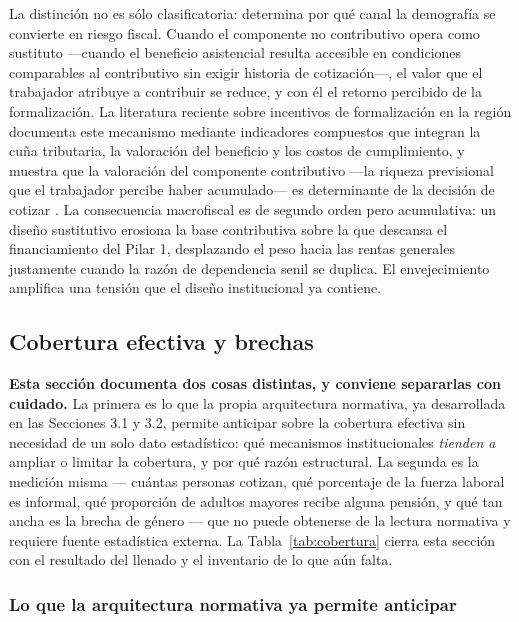 \documentclass[12pt, letterpaper]{article}
\begin{document}
La distinción no es sólo clasificatoria: determina por qué canal la demografía se
convierte en riesgo fiscal. Cuando el componente no contributivo opera como
sustituto ---cuando el beneficio asistencial resulta accesible en condiciones
comparables al contributivo sin exigir historia de cotización---, el valor que el
trabajador atribuye a contribuir se reduce, y con él el retorno percibido de la
formalización. La literatura reciente sobre incentivos de formalización en la
región documenta este mecanismo mediante indicadores compuestos que integran la
cuña tributaria, la valoración del beneficio y los costos de cumplimiento, y
muestra que la valoración del componente contributivo ---la riqueza previsional
que el trabajador percibe haber acumulado--- es determinante de la decisión de
cotizar \citep{wb2025}. La consecuencia macrofiscal es de segundo orden pero
acumulativa: un diseño sustitutivo erosiona la base contributiva sobre la que
descansa el financiamiento del Pilar 1, desplazando el peso hacia las rentas
generales justamente cuando la razón de dependencia senil se duplica. El
envejecimiento amplifica una tensión que el diseño institucional ya contiene.

\subsection{Cobertura efectiva y brechas}

\textbf{Esta sección documenta dos cosas distintas, y conviene separarlas con cuidado.} La primera es lo que la propia arquitectura normativa, ya desarrollada en las Secciones 3.1 y 3.2, permite anticipar sobre la cobertura efectiva sin necesidad de un solo dato estadístico: qué mecanismos institucionales \textit{tienden a} ampliar o limitar la cobertura, y por qué razón estructural. La segunda es la medición misma --- cuántas personas cotizan, qué porcentaje de la fuerza laboral es informal, qué proporción de adultos mayores recibe alguna pensión, y qué tan ancha es la brecha de género --- que no puede obtenerse de la lectura normativa y requiere fuente estadística externa. La Tabla~\ref{tab:cobertura} cierra esta sección con el resultado del llenado y el inventario de lo que aún falta.

\subsubsection{Lo que la arquitectura normativa ya permite anticipar}
\end{document}
